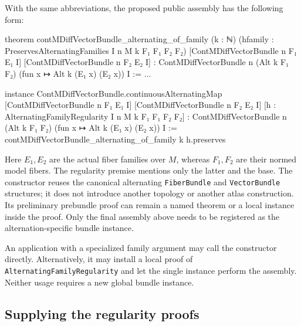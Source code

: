 \documentclass[11pt]{amsart}
\theoremstyle{definition}
\theoremstyle{remark}
\numberwithin{equation}{section}
\begin{document}
With the same abbreviations, the proposed public assembly has the following form:
\begin{leancode}
theorem contMDiffVectorBundle_alternating_of_family
    (k : ℕ)
    (hfamily : PreservesAlternatingFamilies
      I n M k F₁ F₁ F₂ F₂)
    [ContMDiffVectorBundle n F₁ E₁ I]
    [ContMDiffVectorBundle n F₂ E₂ I] :
    ContMDiffVectorBundle n (Alt k F₁ F₂)
      (fun x ↦ Alt k (E₁ x) (E₂ x)) I := ...

instance ContMDiffVectorBundle.continuousAlternatingMap
    [ContMDiffVectorBundle n F₁ E₁ I]
    [ContMDiffVectorBundle n F₂ E₂ I]
    [h : AlternatingFamilyRegularity
      I n M k F₁ F₁ F₂ F₂] :
    ContMDiffVectorBundle n (Alt k F₁ F₂)
      (fun x ↦ Alt k (E₁ x) (E₂ x)) I :=
  contMDiffVectorBundle_alternating_of_family k h.preserves
\end{leancode}

Here $E_1,E_2$ are the actual fiber families over $M$, whereas $F_1,F_2$ are their normed model
fibers. The regularity premise mentions only the latter and the base. The constructor reuses the
canonical alternating \texttt{FiberBundle} and \texttt{VectorBundle} structures; it does not introduce
another topology or another atlas construction. Its preliminary prebundle proof can remain a named
theorem or a local instance inside the proof. Only the final assembly above needs to be registered
as the alternation-specific bundle instance.

An application with a specialized family argument may call the constructor directly. Alternatively,
it may install a local proof of \texttt{AlternatingFamilyRegularity} and let the single instance
perform the assembly. Neither usage requires a new global bundle instance.

\subsection{Supplying the regularity proofs}
\end{document}
